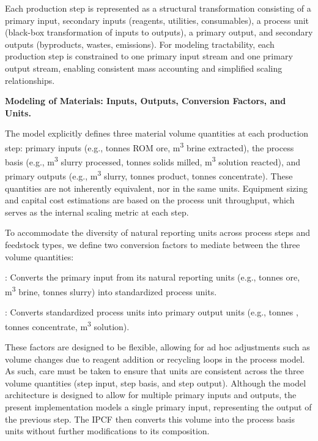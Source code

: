 \documentclass{article}
\renewcommand\_{\textunderscore\allowbreak}
\begin{document}
Each production step is represented as a structural transformation consisting of a primary input, secondary inputs (reagents, utilities, consumables), a process unit (black-box transformation of inputs to outputs), a primary output, and secondary outputs (byproducts, wastes, emissions). For modeling tractability, each production step is constrained to one primary input stream and one primary output stream, enabling consistent mass accounting and simplified scaling relationships.

\medskip
\noindent\textbf{Modeling of Materials: Inputs, Outputs, Conversion Factors, and Units.}\quad

The model explicitly defines three material volume quantities at each production step: primary inputs (e.g., tonnes ROM ore, \si{m^3} brine extracted), the process basis (e.g., \si{m^3} slurry processed, tonnes solids milled, \si{m^3} solution reacted), and primary outputs (e.g., \si{m^3} slurry, tonnes  product, tonnes concentrate). These quantities are not inherently equivalent, nor in the same units. Equipment sizing and capital cost estimations are based on the process unit throughput, which serves as the internal scaling metric at each step.

To accommodate the diversity of natural reporting units across process steps and feedstock types, we define two conversion factors to mediate between the three volume quantities: 

\begin{description}[noitemsep, topsep=0pt]
    \item[\textbullet\enskip Input-to-Process Conversion Factor (IPCF)]: Converts the primary input from its natural reporting units (e.g., tonnes ore, \si{m^3} brine, tonnes slurry) into standardized process units.
    
    \item[\textbullet\enskip Process-to-Output Conversion Factor (POCF)]: Converts standardized process units into primary output units (e.g., tonnes , tonnes concentrate, \si{m^3} solution).
\end{description}

These factors are designed to be flexible, allowing for ad hoc adjustments such as volume changes due to reagent addition or recycling loops in the process model. As such, care must be taken to ensure that units are consistent across the three volume quantities (step input, step basis, and step output). Although the model architecture is designed to allow for multiple primary inputs and outputs, the present implementation models a single primary input, representing the output of the previous step. The IPCF then converts this volume into the process basis units without further modifications to its composition. 
\end{document}
